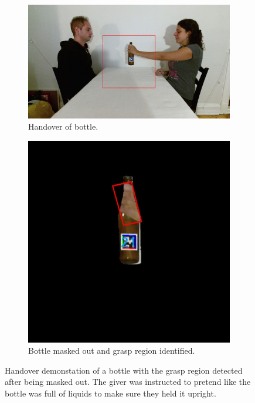 \begin{figure}
	\centering
	\begin{subfigure}[t]{\textwidth}
		\centering
		\includegraphics[width=\textwidth]{img/methods/handovers/bottle_frame.jpg}
		\caption{Handover of bottle.}
		\label{fig:demo_handover_bottle}
	\end{subfigure}
	\par\bigskip
	\begin{subfigure}[t]{0.5\textwidth}
		\centering
		\includegraphics[width=\textwidth]{img/methods/handovers/bottle_masked.jpg}
		\caption{Bottle masked out and grasp region identified.}
		\label{fig:handover_bottle_masked}
	\end{subfigure}
	\caption{Handover demonstation of a bottle with the grasp region detected after being masked out. The giver was instructed to pretend like the bottle was full of liquids to make sure they held it upright.}
	\label{fig:handover_bottle}
\end{figure}

